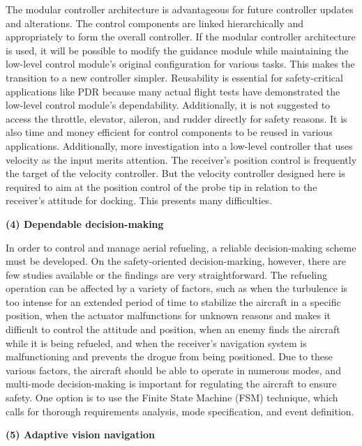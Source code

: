 The modular controller architecture is advantageous for future controller
updates and alterations. The control components are linked hierarchically
and appropriately to form the overall controller. If the modular controller
architecture is used, it will be possible to modify the guidance module
while maintaining the low-level control module's original configuration
for various tasks. This makes the transition to a new controller simpler.
Reusability is essential for safety-critical applications like PDR
because many actual flight tests have demonstrated the low-level control
module's dependability. Additionally, it is not suggested to access
the throttle, elevator, aileron, and rudder directly for safety reasons.
It is also time and money efficient for control components to be reused
in various applications. Additionally, more investigation into a low-level
controller that uses velocity as the input merits attention. The receiver's
position control is frequently the target of the velocity controller.
But the velocity controller designed here is required to aim at the
position control of the probe tip in relation to the receiver's attitude
for docking. This presents many difficulties. 

\textbf{(4) Dependable decision-making} 

In order to control and manage aerial refueling, a reliable decision-making
scheme must be developed. On the safety-oriented decision-marking,
however, there are few studies available or the findings are very
straightforward. The refueling operation can be affected by a variety
of factors, such as when the turbulence is too intense for an extended
period of time to stabilize the aircraft in a specific position, when
the actuator malfunctions for unknown reasons and makes it difficult
to control the attitude and position, when an enemy finds the aircraft
while it is being refueled, and when the receiver's navigation system
is malfunctioning and prevents the drogue from being positioned. Due
to these various factors, the aircraft should be able to operate in
numerous modes, and multi-mode decision-making is important for regulating
the aircraft to ensure safety. One option is to use the Finite State
Machine (FSM) technique, which calls for thorough requirements analysis,
mode specification, and event definition. 

\textbf{(5) Adaptive vision navigation }

